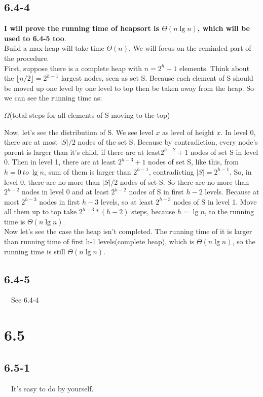 \documentclass{article}
\begin{document}
\subsection*{6.4-4}
\indent \textbf{I will prove the running time of heapsort is $\Theta(n\lg n)$, which will be used to 6.4-5 too}.\\
\indent Build a max-heap will take time $\Theta(n)$. We will focus on the reminded part of the procedure.\\
\indent First, suppose there is a complete heap with $n = 2^h - 1$ elements. Think about the $\lfloor {n/2} \rfloor = 2^{h-1}$ largest nodes, seen as set S. Because each element of S should be moved up one level by one level to top then be taken away from the heap. So we can see the running time as:
\begin{center}
  $\Omega$(total steps for all elements of S moving to the top)
\end{center}
Now, let's see the distribution of S. We see level $x$ as level of height $x$. In level 0, there are at most $|S|/2$ nodes of the set S. Because by contradiction, every node's parent is larger than it's child, if there are at least$2^{h-2}+1$ nodes of set S in level 0. Then in level 1, there are at least   $2^{h-3}+1$ nodes of set S, like this, from $h = 0 ~to~ \lg n$, sum of them is larger than $2^{h-1}$,  contradicting  $|S| = 2^{h-1}$. So, in level 0, there are no more than $|S|/2$ nodes of set S. So there are no more than $2^{h-2}$ nodes in level 0 and at least $2^{h-2}$ nodes of S in first $h-2$ levels. Because at most $2^{h-3}$ nodes in first $h-3$ levels, so at least $2^{h-3}$ nodes of S in level 1. Move all them up to top take $2^{h-3}*(h-2)$ steps, because $h=\lg n$, to the running time is $\Theta(n\lg n)$.\\
\indent Now let's see the case the heap isn't completed. The running time of it is larger than running time of first h-1 levels(complete heap), which is $\Theta(n\lg n)$, so the running time is still $\Theta(n\lg n)$.


\subsection*{6.4-5}
~~See 6.4-4

\section*{6.5}
\subsection*{6.5-1}
~~It's easy to do by yourself.
\end{document}
